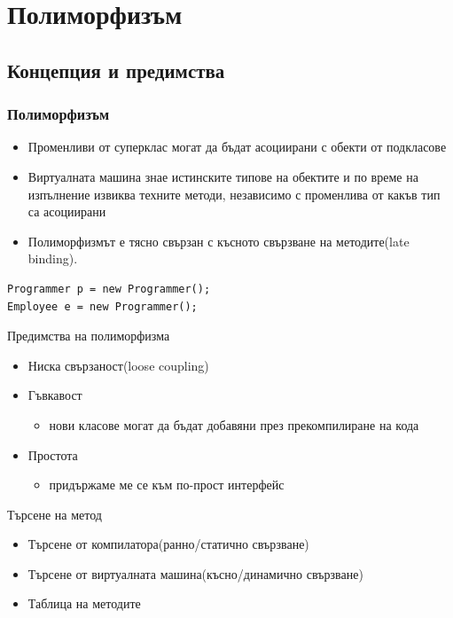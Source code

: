 \documentclass{beamer}
\begin{document}
\section{Полиморфизъм}

\subsection{Концепция и предимства}
\begin{frame}[fragile]
  \frametitle{Полиморфизъм}
  \transdissolve
  \begin{itemize}
    \item Променливи от суперклас могат да бъдат асоциирани с обекти
      от подкласове \pause
    \item Виртуалната машина знае истинските типове на обектите и по
      време на изпълнение извиква техните методи, независимо с
      променлива от какъв тип са асоциирани \pause
    \item Полиморфизмът е тясно свързан с късното свързване на
    методите(late binding). \pause
  \end{itemize}
  \begin{lstlisting}
Programmer p = new Programmer();
Employee e = new Programmer();
  \end{lstlisting}
\end{frame}

\begin{frame}{Предимства на полиморфизма}
  \transdissolve
  \begin{itemize}
  \item Ниска свързаност(loose coupling) \pause
  \item Гъвкавост
    \begin{itemize}
    \item нови класове могат да бъдат добавяни през
      прекомпилиране на кода
    \end{itemize}
  \item Простота
    \begin{itemize}
    \item придържаме ме се към по-прост интерфейс
    \end{itemize}
  \end{itemize}
\end{frame}

\begin{frame}{Търсене на метод}
  \transdissolve
  \begin{itemize}
  \item Търсене от компилатора(ранно/статично свързване) \pause
  \item Търсене от виртуалната машина(късно/динамично свързване) \pause
  \item Таблица на методите
  \end{itemize}
\end{frame}
\end{document}

